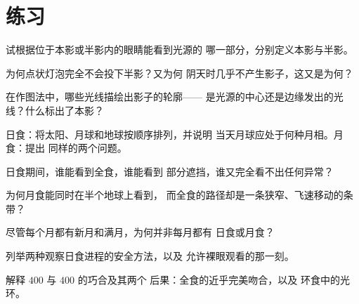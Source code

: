 \section{练习}

\begin{exercise}[$\star$]\label{exo:g7:shadows-eclipses:1}
试根据位于本影或半影内的眼睛能看到光源的
哪一部分，分别定义本影与半影。
\end{exercise}

\begin{exercise}[$\star$]\label{exo:g7:shadows-eclipses:2}
为何点状灯泡完全不会投下半影？又为何
阴天时几乎不产生影子，这又是为何？
\end{exercise}

\begin{exercise}[$\star$]\label{exo:g7:shadows-eclipses:3}
在作图法中，哪些光线描绘出影子的轮廓——
是光源的中心还是边缘发出的光线？什么标出了本影？
\end{exercise}

\begin{exercise}[$\star$]\label{exo:g7:shadows-eclipses:4}
日食：将太阳、月球和地球按顺序排列，并说明
当天月球应处于何种月相。月食：提出
同样的两个问题。
\end{exercise}

\begin{exercise}[$\star$]\label{exo:g7:shadows-eclipses:5}
日食期间，谁能看到全食，谁能看到
部分遮挡，谁又完全看不出任何异常？
\end{exercise}

\begin{exercise}[$\star$]\label{exo:g7:shadows-eclipses:6}
为何月食能同时在半个地球上看到，
而全食的路径却是一条狭窄、飞速移动的条带？
\end{exercise}

\begin{exercise}[$\star$]\label{exo:g7:shadows-eclipses:7}
尽管每个月都有新月和满月，为何并非每月都有
日食或月食？
\end{exercise}

\begin{exercise}[$\star$]\label{exo:g7:shadows-eclipses:8}
列举两种观察日食进程的安全方法，以及
允许裸眼观看的那一刻。
\end{exercise}

\begin{exercise}[$\star\star$]\label{exo:g7:shadows-eclipses:9}
解释 $400$ 与 $400$ 的巧合及其两个
后果：全食的近乎完美吻合，以及
环食中的光环。
\end{exercise}


